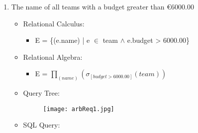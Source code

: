 \begin{enumerate}
    \item The name of all teams with a budget greater than €6000.00
        \begin{itemize}
            \item Relational Calculus:
                \begin{itemize}
                    \item E = \{(e.name) | e $\in$ team $\wedge$ e.budget > 6000.00\}
                \end{itemize}
            \item Relational Algebra:
        	\begin{itemize}
	            \item E = $\prod_{(name)} ( \sigma_{[ budget > 6000.00]} (team) )$
	        \end{itemize}
            \item Query Tree:
            \begin{figure}[H]
            \begin{center}
            \texttt{[image: arbReq1.jpg]}\\
            \end{center}
            \end{figure}
            \item SQL Query:
            
        \end{itemize}


\end{enumerate}
